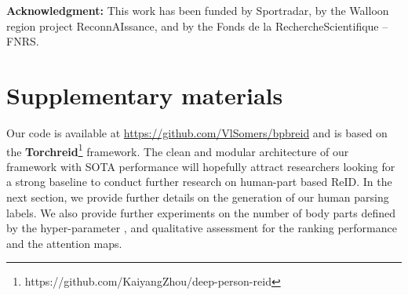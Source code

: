 \documentclass[10pt,twocolumn,letterpaper]{article}
\begin{document}
\textbf{Acknowledgment:}
This work has been funded by Sportradar, by the Walloon region project ReconnAIssance, and by the Fonds de la RechercheScientifique – FNRS.

 







{\small


}


\clearpage
\appendix
\pagebreak
\section*{Supplementary materials}

Our code is available at \url{https://github.com/VlSomers/bpbreid} and is based on the \textbf{Torchreid}\footnote{https://github.com/KaiyangZhou/deep-person-reid} framework.
The clean and modular architecture of our framework with SOTA performance will hopefully attract researchers looking for a strong baseline to conduct further research on human-part based ReID.
In the next section, we provide further details on the generation of our human parsing labels. 
We also provide further experiments on the number of body parts defined by the hyper-parameter , and qualitative assessment for the ranking performance and the attention maps.
\end{document}
